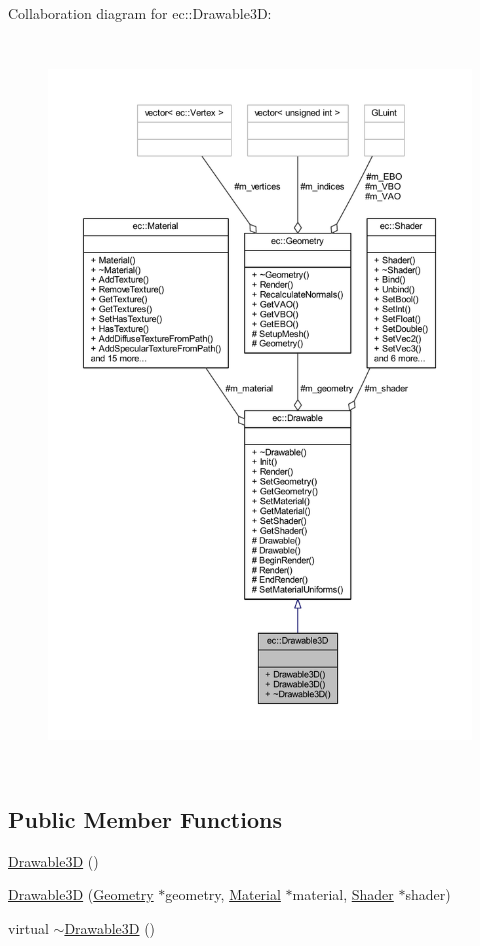 Collaboration diagram for ec\+:\+:Drawable3D\+:
\nopagebreak
\begin{figure}[H]
\begin{center}
\leavevmode
\includegraphics[height=550pt]{classec_1_1_drawable3_d__coll__graph}
\end{center}
\end{figure}
\subsection*{Public Member Functions}
\begin{DoxyCompactItemize}
\item 
\mbox{\hyperlink{classec_1_1_drawable3_d_a35d0247d9c581d07fb1c231acf4c6b75}{Drawable3D}} ()
\item 
\mbox{\hyperlink{classec_1_1_drawable3_d_a3a63fabef637d7e055559944579194d7}{Drawable3D}} (\mbox{\hyperlink{classec_1_1_geometry}{Geometry}} $\ast$geometry, \mbox{\hyperlink{classec_1_1_material}{Material}} $\ast$material, \mbox{\hyperlink{classec_1_1_shader}{Shader}} $\ast$shader)
\item 
virtual \mbox{\hyperlink{classec_1_1_drawable3_d_a172c8139926fafaf2bb236b8c52b25ab}{$\sim$\+Drawable3D}} ()
\end{DoxyCompactItemize}
